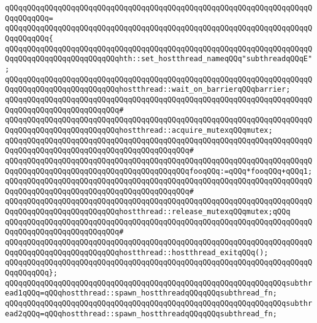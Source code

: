 \verb|qQQqqQQqqQQqqQQqqQQqqQQqqQQqqQQqqQQqqQQqqQQqqQQqqQQqqQQqqQQqqQQqqQQqqQQqqQQqqQQq=|\newline
\verb|qQQqqQQqqQQqqQQqqQQqqQQqqQQqqQQqqQQqqQQqqQQqqQQqqQQqqQQqqQQqqQQqqQQqqQQqqQQqqQQq{|\newline
\verb|qQQqqQQqqQQqqQQqqQQqqQQqqQQqqQQqqQQqqQQqqQQqqQQqqQQqqQQqqQQqqQQqqQQqqQQqqQQqqQQqqQQqqQQqqQQqqQQqhth::set_hostthread_nameqQQq"subthreadqQQqE";|\newline
\newline
\verb|qQQqqQQqqQQqqQQqqQQqqQQqqQQqqQQqqQQqqQQqqQQqqQQqqQQqqQQqqQQqqQQqqQQqqQQqqQQqqQQqqQQqqQQqqQQqqQQqhostthread::wait_on_barrierqQQqbarrier;|\newline
\verb|qQQqqQQqqQQqqQQqqQQqqQQqqQQqqQQqqQQqqQQqqQQqqQQqqQQqqQQqqQQqqQQqqQQqqQQqqQQqqQQqqQQqqQQqqQQqqQQq#|\newline
\verb|qQQqqQQqqQQqqQQqqQQqqQQqqQQqqQQqqQQqqQQqqQQqqQQqqQQqqQQqqQQqqQQqqQQqqQQqqQQqqQQqqQQqqQQqqQQqqQQqhostthread::acquire_mutexqQQqmutex;|\newline
\verb|qQQqqQQqqQQqqQQqqQQqqQQqqQQqqQQqqQQqqQQqqQQqqQQqqQQqqQQqqQQqqQQqqQQqqQQqqQQqqQQqqQQqqQQqqQQqqQQqqQQqqQQqqQQqqQQq#|\newline
\verb|qQQqqQQqqQQqqQQqqQQqqQQqqQQqqQQqqQQqqQQqqQQqqQQqqQQqqQQqqQQqqQQqqQQqqQQqqQQqqQQqqQQqqQQqqQQqqQQqqQQqqQQqqQQqqQQqfooqQQq:=qQQq*fooqQQq+qQQq1;|\newline
\verb|qQQqqQQqqQQqqQQqqQQqqQQqqQQqqQQqqQQqqQQqqQQqqQQqqQQqqQQqqQQqqQQqqQQqqQQqqQQqqQQqqQQqqQQqqQQqqQQqqQQqqQQqqQQqqQQq#|\newline
\verb|qQQqqQQqqQQqqQQqqQQqqQQqqQQqqQQqqQQqqQQqqQQqqQQqqQQqqQQqqQQqqQQqqQQqqQQqqQQqqQQqqQQqqQQqqQQqqQQqhostthread::release_mutexqQQqmutex;qQQq|\newline
\verb|qQQqqQQqqQQqqQQqqQQqqQQqqQQqqQQqqQQqqQQqqQQqqQQqqQQqqQQqqQQqqQQqqQQqqQQqqQQqqQQqqQQqqQQqqQQqqQQq#|\newline
\verb|qQQqqQQqqQQqqQQqqQQqqQQqqQQqqQQqqQQqqQQqqQQqqQQqqQQqqQQqqQQqqQQqqQQqqQQqqQQqqQQqqQQqqQQqqQQqqQQqhostthread::hostthread_exitqQQq();|\newline
\verb|qQQqqQQqqQQqqQQqqQQqqQQqqQQqqQQqqQQqqQQqqQQqqQQqqQQqqQQqqQQqqQQqqQQqqQQqqQQqqQQq};|\newline
\newline
\verb|qQQqqQQqqQQqqQQqqQQqqQQqqQQqqQQqqQQqqQQqqQQqqQQqqQQqqQQqqQQqqQQqsubthread1qQQq=qQQqhostthread::spawn_hostthreadqQQqqQQqsubthread_fn;|\newline
\verb|qQQqqQQqqQQqqQQqqQQqqQQqqQQqqQQqqQQqqQQqqQQqqQQqqQQqqQQqqQQqqQQqsubthread2qQQq=qQQqhostthread::spawn_hostthreadqQQqqQQqsubthread_fn;|\newline
